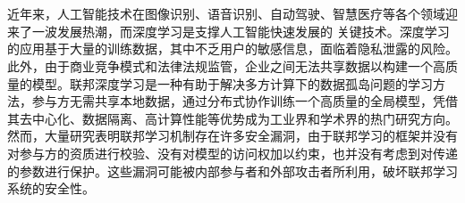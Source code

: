 \vspace{-2.5cm}
\chapter*{}
近年来，人工智能技术在图像识别、语音识别、自动驾驶、智慧医疗等各个领域迎来了一波发展热潮，而深度学习是支撑人工智能快速发展的
关键技术。深度学习的应用基于大量的训练数据，其中不乏用户的敏感信息，面临着隐私泄露的风险。此外，由于商业竞争模式和法律法规监管，企业之间无法共享数据以构建一个高质量的模型。联邦深度学习是一种有助于解决多方计算下的数据孤岛问题的学习方法，参与方无需共享本地数据，通过分布式协作训练一个高质量的全局模型，凭借其去中心化、数据隔离、高计算性能等优势成为工业界和学术界的热门研究方向。然而，大量研究表明联邦学习机制存在许多安全漏洞，由于联邦学习的框架并没有对参与方的资质进行校验、没有对模型的访问权加以约束，也并没有考虑到对传递的参数进行保护。这些漏洞可能被内部参与者和外部攻击者所利用，破坏联邦学习系统的安全性。

